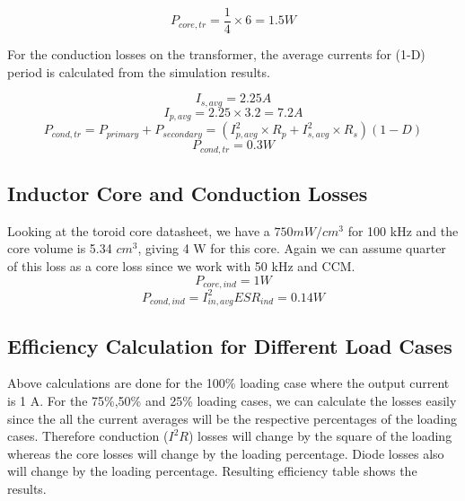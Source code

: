 \begin{equation}
    P_{core,tr} = \frac{1}{4}\times6 = 1.5 W
\end{equation}

For the conduction losses on the transformer, the average currents for (1-D) period is calculated from the simulation results.

\begin{equation}
    I_{s,avg} = 2.25 A
\end{equation}
\begin{equation}
    I_{p,avg} = 2.25\times3.2 = 7.2 A
\end{equation}
\begin{equation}
    P_{cond,tr} = P_{primary} + P_{secondary} = (I^2_{p,avg}\times R_p + I^2_{s,avg}\times R_s)(1-D)
\end{equation}
\begin{equation}
    P_{cond,tr} = 0.3 W
\end{equation}

\subsection{Inductor Core and Conduction Losses}
Looking at the toroid core datasheet, we have a $750mW/cm^3$ for 100 kHz and the core volume is 5.34 $cm^3$, giving 4 W for this core. Again we can assume quarter of this loss as a core loss since we work with 50 kHz and CCM.
\begin{equation}
    P_{core,ind} = 1 W
\end{equation}
\begin{equation}
    P_{cond,ind} = I^2_{in,avg}ESR_{ind} = 0.14 W
\end{equation}

\subsection{Efficiency Calculation for Different Load Cases}
Above calculations are done for the 100\% loading case where the output current is 1 A. For the 75\%,50\% and 25\% loading cases, we can calculate the losses easily since the all the current averages will be the respective percentages of the loading cases. Therefore conduction ($I^2R$) losses will change by the square of the loading whereas the core losses will change by the loading percentage. Diode losses also will change by the loading percentage. Resulting efficiency table shows the results.

